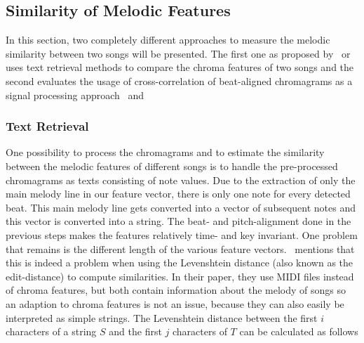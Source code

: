 \subsection{Similarity of Melodic Features}

In this section, two completely different approaches to measure the melodic similarity between two songs will be presented. The first one as proposed by~\cite{chroma1} or~\cite{chroma4} uses text retrieval methods to compare the chroma features of two songs and the second evaluates the usage of cross-correlation of beat-aligned chromagrams as a signal processing approach~\cite{chroma2} and~\cite{chroma3}

\subsubsection{Text Retrieval}\label{textretr}

One possibility to process the chromagrams and to estimate the similarity between the melodic features of different songs is to handle the pre-processed chromagrams as texts consisting of note values. Due to the extraction of only the main melody line in our feature vector, there is only one note for every detected beat. This main melody line gets converted into a vector of subsequent notes and this vector is converted into a string. The beat- and pitch-alignment done in the previous steps makes the features relatively time- and key invariant. One problem that remains is the different length of the various feature vectors.~\cite{chroma4} mentions that this is indeed a problem when using the Levenshtein distance (also known as the edit-distance) to compute similarities. In their paper, they use MIDI files instead of chroma features, but both contain information about the melody of songs so an adaption to chroma features is not an issue, because they can also easily be interpreted as simple strings. The Levenshtein distance between the first $i$ characters of a string $S$ and the first $j$ characters of $T$ can be calculated as follows \cite[p. 7]{chroma4}


